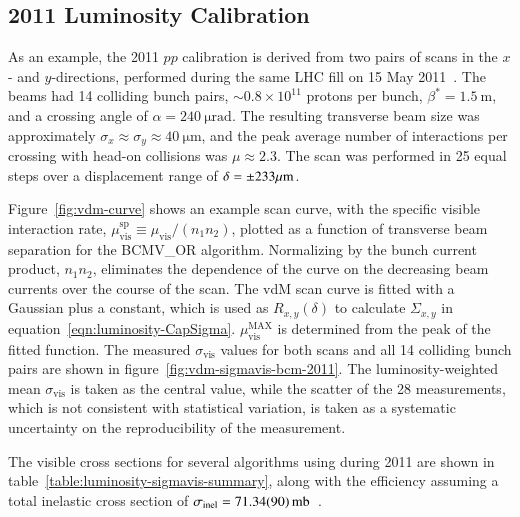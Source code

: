 \subsection{2011 Luminosity Calibration}

As an example, the 2011 $pp$ calibration is derived from two pairs of scans in the $x$- and $y$-directions, performed during the same LHC fill on 15 May 2011~\cite{Aad:2013ucp}. The beams had 14 colliding bunch pairs, $\sim0.8\times 10^{11}$ protons per bunch, $\beta^*=\SI{1.5}{\meter}$, and a crossing angle of $\alpha=\SI{240}{\micro\radian}$. The resulting transverse beam size was approximately $\sigma_{x}\approx\sigma_{y}\approx \SI{40}{\micro\meter}$, and the peak average number of interactions per crossing with head-on collisions was $\mu\approx 2.3$. The scan was performed in 25 equal steps over a displacement range of $\delta=\pm 233 \mu\mathrm{m}$.

Figure~\ref{fig:vdm-curve} shows an example scan curve, with the specific visible interaction rate, $\mu_{\mathrm{vis}}^{\mathrm{sp}}\equiv \mu_{\mathrm{vis}}/(n_1n_2)$, plotted as a function of transverse beam separation for the BCMV\_OR algorithm. Normalizing by the bunch current product, $n_1n_2$, eliminates the dependence of the curve on the decreasing beam currents over the course of the scan. The vdM scan curve is fitted with a Gaussian plus a constant, which is used as $R_{x,y}(\delta)$ to calculate $\Sigma_{x,y}$ in equation~\ref{eqn:luminosity-CapSigma}. $\mu_{\mathrm{vis}}^{\mathrm{MAX}}$ is determined from the peak of the fitted function. The measured $\sigma_{\mathrm{vis}}$ values for both scans and all 14 colliding bunch pairs are shown in figure~\ref{fig:vdm-sigmavis-bcm-2011}. The luminosity-weighted mean $\sigma_{\mathrm{vis}}$ is taken as the central value, while the scatter of the 28 measurements, which is not consistent with statistical variation, is taken as a systematic uncertainty on the reproducibility of the measurement. 

The visible cross sections for several algorithms using during 2011 are shown in table~\ref{table:luminosity-sigmavis-summary}, along with the efficiency assuming a total inelastic cross section of $\sigma_{\mathrm{inel}}= \SI{71.34\pm0.9}{\milli\barn}$~\cite{TheATLASCollaboration:2014jo}.

